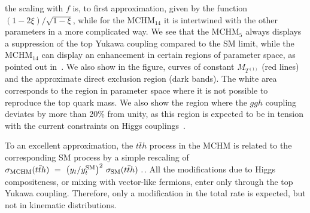 the scaling with $f$ is, to first approximation, given by the function
$(1-2\xi)/\sqrt{1-\xi}$, while for the MCHM$_{14}$ it is
intertwined with the other parameters in a more complicated way.  We
see that the MCHM$_5$ always displays a suppression of the top Yukawa
coupling compared to the SM limit, while the MCHM$_{14}$ can display
an enhancement in certain regions of parameter space, as pointed out
in~\cite{Liu:2017dsz}.  We also show in the figure, curves of constant
$M_{T^{(1)}}$ (red lines) and the approximate direct exclusion region
(dark bands).  The white area corresponds to the region in parameter
space where it is not possible to reproduce the top quark mass.  We
also show the region where the $ggh$ coupling deviates by more than
20\% from unity, as this region is expected to be in tension with the
current constraints on Higgs couplings~\cite{Khachatryan:2016vau}.

\label{tth}
To an excellent approximation, the $t\bar{t} h$ process in the MCHM
is related to the corresponding SM process by a simple rescaling of $\sigma_{\rm MCHM}(t\bar{t}h) ~=~ \left( y_t/y_t^{\rm SM} \right)^2 \, \sigma_{\rm SM}(t\bar{t}h)~.
\label{sigmatth}$.
All the modifications due to Higgs compositeness, or mixing with
vector-like fermions, enter only through the top Yukawa coupling.
Therefore, only a modification in the total rate is expected, but not in kinematic distributions.
%
%

